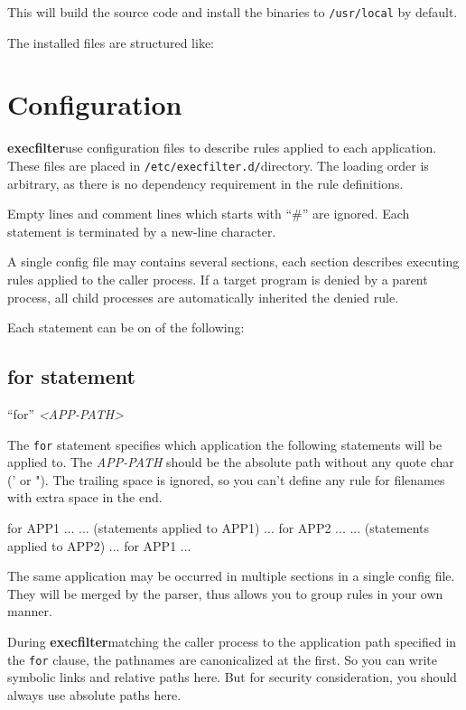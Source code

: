 \documentclass[hyperref, bookmark]{z-article}
\newcommand\code[1]{\texttt{#1}}
\newcommand\syntax[1]{
  \begin{mdframed}[
      linecolor=brown,
      linewidth=2pt,
    ]
    #1
  \end{mdframed}
}
\newcommand\xfilt{\textbf{execfilter}}
\newcommand\configdir{\texttt{/etc/execfilter.d/}}
\begin{document}
This will build the source code and install the binaries to \code{/usr/local}
by default.

The installed files are structured like:

\def\filetreescale{0.7}


\section {Configuration}

\xfilt use configuration files to describe rules applied to each
application. These files are placed in \configdir directory. The loading order
is arbitrary, as there is no dependency requirement in the rule definitions.

Empty lines and comment lines which starts with ``\#'' are ignored.  Each statement
is terminated by a new-line character.

A single config file may contains several sections, each section describes
executing rules applied to the caller process.  If a target program is denied by
a parent process, all child processes are automatically inherited the denied
rule.

Each statement can be on of the following:

\subsection {for statement}

\syntax{
  ``for'' \textit{<APP-PATH>}
}

The \code{for} statement specifies which application the following statements
will be applied to. The \textit{APP-PATH} should be the absolute path without
any quote char (' or ").  The trailing space is ignored, so you can't define any
rule for filenames with extra space in the end.

\begin{codeblk}
  for APP1
  ...
  ... (statements applied to APP1)
  ...
  for APP2
  ...
  ... (statements applied to APP2)
  ...
  for APP1
  ...
\end{codeblk}

The same application may be occurred in multiple sections in a single config
file.  They will be merged by the parser, thus allows you to group rules in your
own manner.

During \xfilt matching the caller process to the application path specified in
the \code{for} clause, the pathnames are canonicalized at the first.  So you can
write symbolic links and relative paths here. But for security consideration,
you should always use absolute paths here.
\end{document}
